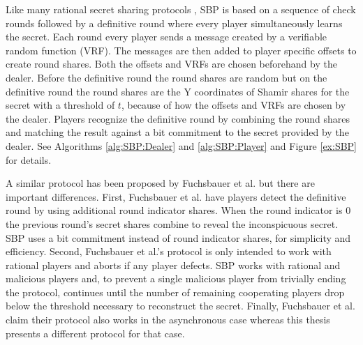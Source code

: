 \documentclass{dalcsthesis}
\begin{document}
Like many rational secret sharing protocols \cite{halpern04, kol08, fuch10}, SBP is based on a sequence of check rounds followed by a definitive round where every player simultaneously learns the secret. Each round every player sends a message created by a verifiable random function (VRF). The messages are then added to player specific offsets to create round shares. Both the offsets and VRFs are chosen beforehand by the dealer. Before the definitive round the round shares are random but on the definitive round the round shares are the Y coordinates of Shamir shares for the secret with a threshold of $t$, because of how the offsets and VRFs are chosen by the dealer. Players recognize the definitive round by combining the round shares and matching the result against a bit commitment to the secret provided by the dealer. See Algorithms \ref{alg:SBP:Dealer} and \ref{alg:SBP:Player} and Figure \ref{ex:SBP} for details.

A similar protocol has been proposed by Fuchsbauer et al. \cite{fuch10} but there are important differences. First, Fuchsbauer et al. have players detect the definitive round by using additional round indicator shares. When the round indicator is 0 the previous round's secret shares combine to reveal the inconspicuous secret. SBP uses a bit commitment instead of round indicator shares, for simplicity and efficiency. Second, Fuchsbauer et al.'s protocol is only intended to work with rational players and aborts if any player defects. SBP works with rational and malicious players and, to prevent a single malicious player from trivially ending the protocol, continues until the number of remaining cooperating players drop below the threshold necessary to reconstruct the secret. Finally, Fuchsbauer et al. claim their protocol also works in the asynchronous case whereas this thesis presents a different protocol for that case.
\end{document}
